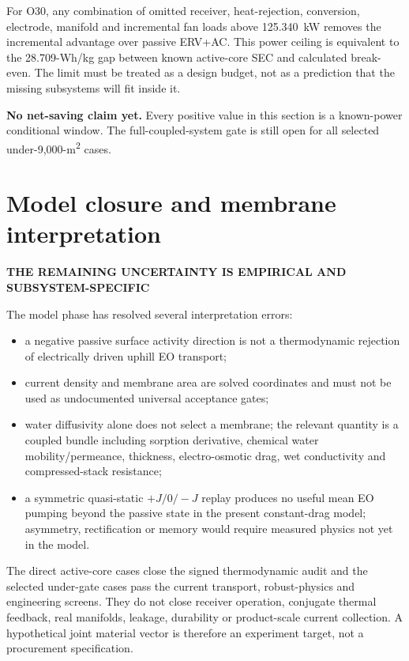 \documentclass[10pt,a4paper]{article}
\newcommand{\sans}{\fontfamily{qhv}\selectfont}
\newcommand{\eyebrow}[1]{{\sans\bfseries\color{Teal}\MakeUppercase{#1}}\par\vspace{1.5mm}}
\begin{document}
For O30, any combination of omitted receiver, heat-rejection, conversion,
electrode, manifold and incremental fan loads above 125.340~kW removes the
incremental advantage over passive ERV+AC. This power ceiling is equivalent to
the 28.709-Wh/kg gap between known active-core SEC and calculated break-even.
The limit must be treated as a design budget, not as a prediction that the
missing subsystems will fit inside it.

\begin{stopbox}
\textbf{No net-saving claim yet.} Every positive value in this section is a
known-power conditional window. The full-coupled-system gate is still open for
all selected under-9,000-m\textsuperscript{2} cases.
\end{stopbox}

\section{Model closure and membrane interpretation}
\eyebrow{The remaining uncertainty is empirical and subsystem-specific}

The model phase has resolved several interpretation errors:
\begin{itemize}
  \item a negative passive surface activity direction is not a thermodynamic
  rejection of electrically driven uphill EO transport;
  \item current density and membrane area are solved coordinates and must not
  be used as undocumented universal acceptance gates;
  \item water diffusivity alone does not select a membrane; the relevant
  quantity is a coupled bundle including sorption derivative, chemical water
  mobility/permeance, thickness, electro-osmotic drag, wet conductivity and
  compressed-stack resistance;
  \item a symmetric quasi-static $+J/0/-J$ replay produces no useful mean EO
  pumping beyond the passive state in the present constant-drag model;
  asymmetry, rectification or memory would require measured physics not yet in
  the model.
\end{itemize}

The direct active-core cases close the signed thermodynamic audit and the
selected under-gate cases pass the current transport, robust-physics and
engineering screens. They do not close receiver operation, conjugate thermal
feedback, real manifolds, leakage, durability or product-scale current
collection. A hypothetical joint material vector is therefore an experiment
target, not a procurement specification.
\end{document}
